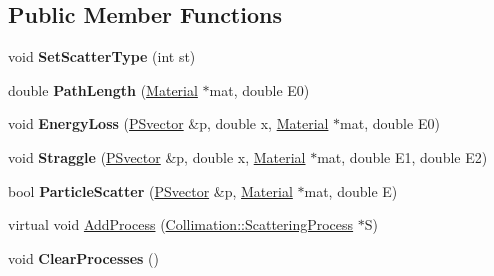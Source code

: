 \subsection*{Public Member Functions}
\begin{DoxyCompactItemize}
\item 
\mbox{\label{classCollimation_1_1ScatteringModel_af0f4f845010afa08e73c994f403b9594}} 
void {\bfseries Set\+Scatter\+Type} (int st)
\item 
\mbox{\label{classCollimation_1_1ScatteringModel_ae02a9599c204920f5dad460c03f4b06b}} 
double {\bfseries Path\+Length} (\hyperlink{classMaterial}{Material} $\ast$mat, double E0)
\item 
\mbox{\label{classCollimation_1_1ScatteringModel_a7e66a2e5ba9751820c71d136eee6c8e5}} 
void {\bfseries Energy\+Loss} (\hyperlink{classPSvector}{P\+Svector} \&p, double x, \hyperlink{classMaterial}{Material} $\ast$mat, double E0)
\item 
\mbox{\label{classCollimation_1_1ScatteringModel_a57f0a007a6262d51bd53c31bb9d915fc}} 
void {\bfseries Straggle} (\hyperlink{classPSvector}{P\+Svector} \&p, double x, \hyperlink{classMaterial}{Material} $\ast$mat, double E1, double E2)
\item 
\mbox{\label{classCollimation_1_1ScatteringModel_afe215c86a71492355efc6c622872c442}} 
bool {\bfseries Particle\+Scatter} (\hyperlink{classPSvector}{P\+Svector} \&p, \hyperlink{classMaterial}{Material} $\ast$mat, double E)
\item 
virtual void \hyperlink{classCollimation_1_1ScatteringModel_a2e670af5fbb3c40a4f294e135f14892b}{Add\+Process} (\hyperlink{classCollimation_1_1ScatteringProcess}{Collimation\+::\+Scattering\+Process} $\ast$S)
\item 
\mbox{\label{classCollimation_1_1ScatteringModel_a5740bae984dbed3dfdb4fe3b356d74b5}} 
void {\bfseries Clear\+Processes} ()
\item 
\mbox{\label{classCollimation_1_1ScatteringModel_a7e7b3d041e2cf13e9ea4b777390c728f}} 

\end{DoxyCompactItemize}

